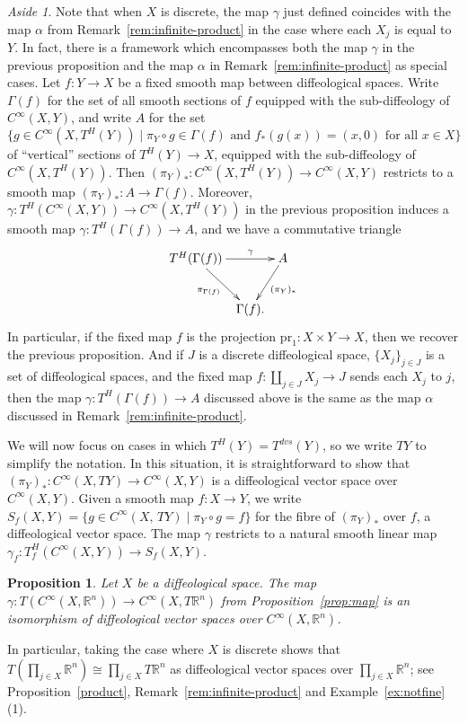 \documentclass{amsart}
\newtheorem{prop}[de]{Proposition}
\theoremstyle{remark}
\newtheorem{aside}[de]{Aside}
\newcommand{\ra}{\to}
\newcommand{\pr}{{\mathrm{pr}}}
\def \R{\mathbb{R}}
\begin{document}
\begin{aside}
Note that when $X$ is discrete, the map $\gamma$ just defined
coincides with the map $\alpha$ from Remark~\ref{rem:infinite-product}
in the case where each $X_j$ is equal to $Y$.
In fact, there is a framework which encompasses both the map $\gamma$ in the previous proposition
and the map $\alpha$ in Remark~\ref{rem:infinite-product} as special cases.
Let $f:Y \ra X$ be a fixed smooth map between diffeological spaces.
Write $\Gamma(f)$ for the set of all smooth sections of $f$ equipped with the sub-diffeology of $C^\infty(X,Y)$,
and write $A$ for the set $\{g \in C^\infty(X,T^H(Y)) \mid \pi_Y \circ g \in \Gamma(f) \text{ and } f_*(g(x))=(x,0) \text{ for all } x \in X\}$ of ``vertical'' sections of $T^H(Y) \to X$,
equipped with the sub-diffeology of $C^\infty(X,T^H(Y))$.
Then $(\pi_Y)_*:C^\infty(X,T^H(Y)) \ra C^\infty(X,Y)$ restricts to a smooth map $(\pi_Y)_*:A \ra \Gamma(f)$.
Moreover, $\gamma:T^H(C^\infty(X,Y)) \ra C^\infty(X,T^H(Y))$ in the previous proposition induces a smooth map $\gamma:T^H(\Gamma(f)) \ra A$,
and we have a commutative triangle
\[
\xymatrix@C5pt{T^H(\Gamma(f)) \ar[rr]^-{\gamma} \ar[dr]_{\pi_{\Gamma(f)}} && A \ar[dl]^{(\pi_Y)_*} \\ & \Gamma(f).}
\]
In particular,
if the fixed map $f$ is the projection $\pr_1:X \times Y \ra X$, then we recover the previous proposition.
And if $J$ is a discrete diffeological space, $\{X_j\}_{j \in J}$ is a set of diffeological spaces,
and the fixed map $f: \coprod_{j \in J} X_j \ra J$ sends each $X_j$ to $j$,
then the map $\gamma:T^H(\Gamma(f)) \ra A$ discussed above is the same as the map $\alpha$ discussed in Remark~\ref{rem:infinite-product}.
\end{aside}

%
%
%
%
%
%
%
%
%
%

We will now focus on cases in which $T^H(Y) = T^{dvs}(Y)$, so we write $TY$
to simplify the notation.
In this situation, it is straightforward to show that
$(\pi_Y)_*: C^\infty(X,TY) \ra C^\infty(X,Y)$
is a diffeological vector space over $C^\infty(X,Y)$.
Given a smooth map $f : X \to Y$, we write
$S_f(X,Y)=\{ g \in C^\infty(X, \, TY) \mid \pi_Y \circ g=f \}$
for the fibre of $(\pi_Y)_*$ over $f$, a diffeological vector space.
The map $\gamma$ restricts to a natural smooth linear map
$\gamma_f: T_f^H(C^\infty(X,Y)) \ra S_f(X,Y)$.

\begin{prop}\label{prop:isots}
Let $X$ be a diffeological space.
The map $\gamma:T(C^\infty(X,\R^n)) \ra C^\infty(X,T\R^n)$
from Proposition~\ref{prop:map} is an isomorphism of diffeological
vector spaces over $C^\infty(X,\R^n)$.
\end{prop}
%
%
In particular, taking the case where $X$ is discrete shows that
$T(\prod_{j \in X} \R^n) \cong \prod_{j \in X} T\R^n$ as diffeological vector spaces over $\prod_{j \in X} \R^n$;
see Proposition~\ref{product}, Remark~\ref{rem:infinite-product}
and Example~\ref{ex:notfine}(1).
\end{document}
